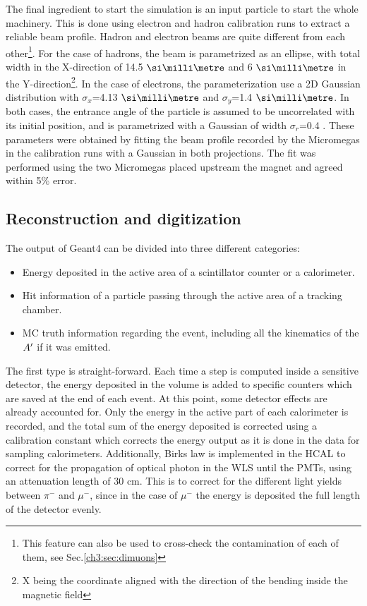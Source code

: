 The final ingredient to start the simulation is an input particle to start the whole machinery. This is done using electron and hadron calibration runs to extract a reliable beam profile. Hadron and electron beams are quite different from each other\footnote{This feature can also be used to cross-check the contamination of each of them, see Sec.\ref{ch3:sec:dimuons}}. For the case of hadrons, the beam is parametrized as an ellipse, with total width in the X-direction of 14.5 $\mmi$ and 6 $\mmi$ in the Y-direction\footnote{X being the coordinate aligned with the direction of the bending inside the magnetic field}. In the case of electrons, the parameterization use a 2D Gaussian distribution with $\sigma_x$=4.13 $\mmi$ and $\sigma_y$=1.4 $\mmi$. In both cases, the entrance angle of the particle is assumed to be uncorrelated with its initial position, and is parametrized with a Gaussian of width $\sigma_r$=0.4 \mrad. These parameters were obtained by fitting the beam profile recorded by the Micromegas in the calibration runs with a Gaussian in both projections. The fit was performed using the two Micromegas placed upstream the magnet and agreed within 5\% error.

\subsection{Reconstruction and digitization}
\label{ch3:sec:geant4-digitization}

The output of Geant4 can be divided into three different categories:

\begin{itemize}
\item Energy deposited in the active area of a scintillator counter or a calorimeter.
\item Hit information of a particle passing through the active area of a tracking chamber.
\item MC truth information regarding the event, including all the kinematics of the $A'$ if it was emitted.
\end{itemize}

The first type is straight-forward. Each time a step is computed inside a sensitive detector, the energy deposited in the volume is added to specific counters which are saved at the end of each event. At this point, some detector effects are already accounted for. Only the energy in the active part of each calorimeter is recorded, and the total sum of the energy deposited is corrected using a calibration constant which corrects the energy output as it is done in the data for sampling calorimeters. Additionally, Birks law \cite{NYIBULE2014141} is implemented in the HCAL to correct for the propagation of optical photon in the WLS until the PMTs, using an attenuation length of 30 \si{\centi\meter}. This is to correct for the different light yields between $\pi^-$ and $\mu^-$, since in the case of $\mu^-$ the energy is deposited the full length of the detector evenly.

